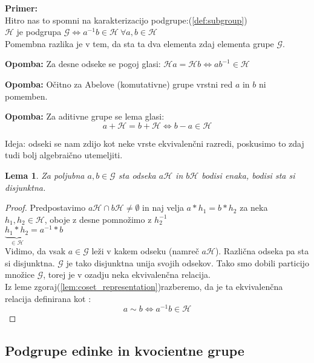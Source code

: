 \documentclass[a4paper]{article}
\newcounter{environment:definition_counter}
\newcounter{environment:theorem_counter}
\newcounter{environment:statement_counter}
\newcounter{example:example_counter}
\newenvironment{example}
{\textbf{Primer:}\\}
{\setcounter{example:example_counter}{0}}
\newenvironment{remark}
{\textbf{Opomba:}}
{}
\newtheorem{lemma}{Lema}
\begin{document}
\begin{example}
Hitro nas to spomni na karakterizacijo podgrupe:(\ref{def:subgroup})\\
$\mathcal{H}$ je podgrupa $\mathcal{G} \iff a^{-1}b \in \mathcal{H} \ \forall a,b \in \mathcal{H}$\\
Pomembna razlika je v tem, da sta ta dva elementa zdaj elementa grupe $\mathcal{G}$.

\begin{remark}
Za desne odseke se pogoj glasi: $\mathcal{H}a = \mathcal{H}b \iff ab^{-1} \in \mathcal{H}$
\end{remark}

\begin{remark}
Očitno za Abelove (komutativne) grupe vrstni red $a$ in $b$ ni pomemben.
\end{remark}

\begin{remark}
Za aditivne grupe se lema glasi:
$$a + \mathcal{H} = b + \mathcal{H} \iff b - a \in \mathcal{H}$$
\end{remark}


\end{example}

Ideja: odseki se nam zdijo kot neke vrste ekvivalenčni razredi, poskusimo to zdaj tudi bolj algebraično utemeljiti.

\begin{lemma}
Za poljubna $a, b \in \mathcal{G}$ sta odseka $a\mathcal{H}$ in $b\mathcal{H}$ bodisi enaka, bodisi sta si disjunktna.
\end{lemma}

\begin{proof}
Predpostavimo $a\mathcal{H} \cap b\mathcal{H} \neq \emptyset$ in naj velja $a*h_1 = b*h_2$ za neka $h_1, h_2 \in \mathcal{H}$, oboje z desne pomnožimo z $h_2^{-1}$\\
$\underbrace{h_1*h_2}_{\in \mathcal{H}} = a^{-1}*b$\\
Vidimo, da vsak $a \in\mathcal{G}$ leži v kakem odseku (namreč $a\mathcal{H}$). Različna odseka pa sta si disjunktna. $\mathcal{G}$ je tako disjunktna unija svojih odsekov. Tako smo dobili particijo množice $\mathcal{G}$, torej je v ozadju neka ekvivalenčna relacija.\\
Iz leme zgoraj(\ref{lem:coset_representation})razberemo, da je ta ekvivalenčna relacija definirana kot :
$$a \sim b \iff a^{-1}b \in \mathcal{H}$$

\end{proof}

\subsection{Podgrupe edinke in kvocientne grupe}
\end{document}

